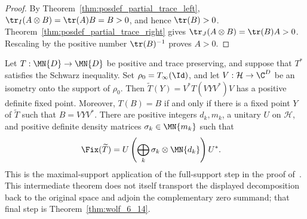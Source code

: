 \begin{proof}
    \leanok
    By Theorem~\ref{thm:posdef_partial_trace_left},
    $\tr_I(A\otimes B)=\tr(A)B=B>0$, and hence $\tr(B)>0$.
    Theorem~\ref{thm:posdef_partial_trace_right} gives
    $\tr_J(A\otimes B)=\tr(B)A>0$. Rescaling by the positive number
    $\tr(B)^{-1}$ proves $A>0$.
\end{proof}

\begin{theorem}%
    \label{thm:maximal_support_compression_density_blocks}
    \leanok
    Let $T:\MN{D}\to\MN{D}$ be positive and trace preserving, and suppose
    that $T^*$ satisfies the Schwarz inequality. Set
    $\rho_0=T_\infty(\Id)$, and let $V:\mathcal H\to\C^D$ be an isometry
    onto the support of $\rho_0$. Then
    $\widetilde T(Y)=V^*T(VYV^*)V$ has a positive definite fixed point.
    Moreover, $T(B)=B$ if and only if there is a fixed point $Y$ of
    $\widetilde T$ such that $B=VYV^*$. There are positive integers
    $d_k,m_k$, a unitary $U$ on $\mathcal H$, and positive definite
    density matrices $\sigma_k\in\MN{m_k}$ such that
    \begin{align}
        \Fix(\widetilde T)
        &=U\left(\bigoplus_k\sigma_k\otimes\MN{d_k}\right)U^*.
        \label{eq:spectral_max_support_blocks}
    \end{align}
    This is the maximal-support application of the full-support step in the
    proof of~\cite[Theorem~6.14]{Wolf2012Quantum}. This intermediate theorem
    does not itself transport the displayed decomposition back to the original
    space and adjoin the complementary zero summand; that final step is
    Theorem~\ref{thm:wolf_6_14}.
\end{theorem}

